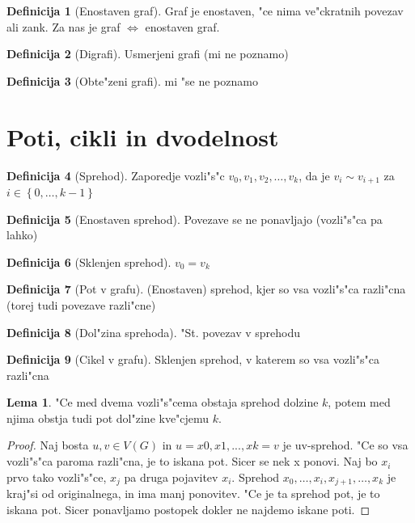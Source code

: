 \documentclass{article}
\theoremstyle{definition}
\newtheorem{definition}{Definicija}[section]
\newtheorem{lemma}{Lema}[section]
\begin{document}
	\begin{definition}[Enostaven graf]
		Graf je enostaven, "ce nima ve"ckratnih povezav ali zank. Za nas je graf $\iff$ enostaven graf.
	\end{definition}
	\begin{definition}[Digrafi]
		Usmerjeni grafi (mi ne poznamo)
	\end{definition}
	\begin{definition}[Obte"zeni grafi]
		mi "se ne poznamo
	\end{definition}
	
\section{Poti, cikli in dvodelnost}
	\begin{definition}[Sprehod]
		Zaporedje vozli"s"c $v_0,v_1,v_2,\ldots,v_k$, da je $v_i \sim v_{i+1}$ za $i \in \left\lbrace 0, \ldots, k-1 \right\rbrace $ 
	\end{definition}
	\begin{definition}[Enostaven sprehod]
		Povezave se ne ponavljajo (vozli"s"ca pa lahko)
	\end{definition}
	\begin{definition}[Sklenjen sprehod]
		$v_0 = v_k$
	\end{definition}
	\begin{definition}[Pot v grafu]
		(Enostaven) sprehod, kjer so vsa vozli"s"ca razli"cna (torej tudi povezave razli"cne)
	\end{definition}
	\begin{definition}[Dol"zina sprehoda]
		"St. povezav v sprehodu
	\end{definition}
	\begin{definition}[Cikel v grafu]
		Sklenjen sprehod, v katerem so vsa vozli"s"ca razli"cna
	\end{definition}

	\begin{lemma}
		"Ce med dvema vozli"s"cema obstaja sprehod dolzine $k$, potem med njima obstja tudi pot dol"zine kve"cjemu $k$.
		\begin{proof}
			Naj bosta $u,v \in V(G)$ in $u=x0,x1,...,xk=v$ je uv-sprehod. "Ce so vsa vozli"s"ca paroma razli"cna, je to iskana pot. Sicer se nek x ponovi. Naj bo $x_i$ prvo tako vozli"s"ce, $x_j$ pa druga pojavitev $x_i$. Sprehod $x_0, \ldots, x_i, x_{j+1}, \ldots, x_k$ je kraj"si od originalnega, in ima manj ponovitev. "Ce je ta sprehod pot, je to iskana pot. Sicer ponavljamo postopek dokler ne najdemo iskane poti.
		\end{proof}
	\end{lemma}
	
\end{document}
